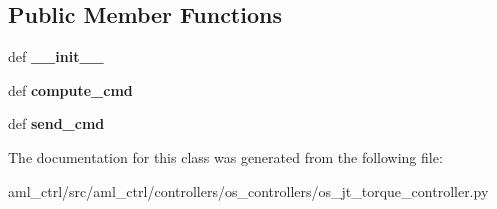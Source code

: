 \subsection*{Public Member Functions}
\begin{DoxyCompactItemize}
\item 
\hypertarget{classaml__ctrl_1_1controllers_1_1os__controllers_1_1os__jt__torque__controller_1_1_o_s_j_t_torque_controller_a3fbf26dde3a732af18afe8be4e83d54e}{def {\bfseries \-\_\-\-\_\-init\-\_\-\-\_\-}}\label{classaml__ctrl_1_1controllers_1_1os__controllers_1_1os__jt__torque__controller_1_1_o_s_j_t_torque_controller_a3fbf26dde3a732af18afe8be4e83d54e}

\item 
\hypertarget{classaml__ctrl_1_1controllers_1_1os__controllers_1_1os__jt__torque__controller_1_1_o_s_j_t_torque_controller_a3cb752b8f0779f87375a967809b87f1c}{def {\bfseries compute\-\_\-cmd}}\label{classaml__ctrl_1_1controllers_1_1os__controllers_1_1os__jt__torque__controller_1_1_o_s_j_t_torque_controller_a3cb752b8f0779f87375a967809b87f1c}

\item 
\hypertarget{classaml__ctrl_1_1controllers_1_1os__controllers_1_1os__jt__torque__controller_1_1_o_s_j_t_torque_controller_aee337f398f6518c05d2cb14da3f78b5e}{def {\bfseries send\-\_\-cmd}}\label{classaml__ctrl_1_1controllers_1_1os__controllers_1_1os__jt__torque__controller_1_1_o_s_j_t_torque_controller_aee337f398f6518c05d2cb14da3f78b5e}

\end{DoxyCompactItemize}


The documentation for this class was generated from the following file\-:\begin{DoxyCompactItemize}
\item 
aml\-\_\-ctrl/src/aml\-\_\-ctrl/controllers/os\-\_\-controllers/os\-\_\-jt\-\_\-torque\-\_\-controller.\-py\end{DoxyCompactItemize}
